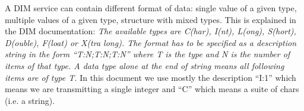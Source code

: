 \documentclass[a4paper]{article}
\begin{document}
\label{app:dimFormat}
A DIM service can contain different format of data: single value of a given
type, multiple values of a given type, structure with mixed types. This is
explained in the DIM documentation\cite{biblio:DIM}:
\textit{The available types are C(har), I(nt), L(ong), S(hort), D(ouble),
F(loat) or X(tra long). The format has to be specified as a description string in the form
``T:N;T:N;T:N'' where T is the type and N is the number of items of that type.
A data type alone at the end of string means all following items are of type T.}
In this document we use mostly the description ``I:1'' which means we are
transmitting a single integer and ``C'' which means a suite of chars (i.e. a
string).

\thebibliography{}

\end{document}

